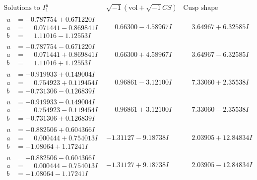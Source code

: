 \documentclass[1p]{elsarticle_modified}
\theoremstyle{definition}
\newcommand{\I}{\sqrt{-1}}
\begin{document}
$$\begin{array}{c|c|c}  
\text{Solutions to }I^u_{1}& \I (\text{vol} + \sqrt{-1}CS) & \text{Cusp shape}\\
 \hline 
\begin{aligned}
u &= -0.787754 + 0.671220 I \\
a &= \phantom{-}0.071441 - 0.869841 I \\
b &= \phantom{-}1.11016 - 1.12553 I\end{aligned}
 & \phantom{-}0.66300 - 4.58967 I & \phantom{-}3.64967 + 6.32585 I \\ \hline\begin{aligned}
u &= -0.787754 - 0.671220 I \\
a &= \phantom{-}0.071441 + 0.869841 I \\
b &= \phantom{-}1.11016 + 1.12553 I\end{aligned}
 & \phantom{-}0.66300 + 4.58967 I & \phantom{-}3.64967 - 6.32585 I \\ \hline\begin{aligned}
u &= -0.919933 + 0.149004 I \\
a &= \phantom{-}0.754923 + 0.119454 I \\
b &= -0.731306 - 0.126839 I\end{aligned}
 & \phantom{-}0.96861 - 3.12100 I & \phantom{-}7.33060 + 2.35538 I \\ \hline\begin{aligned}
u &= -0.919933 - 0.149004 I \\
a &= \phantom{-}0.754923 - 0.119454 I \\
b &= -0.731306 + 0.126839 I\end{aligned}
 & \phantom{-}0.96861 + 3.12100 I & \phantom{-}7.33060 - 2.35538 I \\ \hline\begin{aligned}
u &= -0.882506 + 0.604366 I \\
a &= \phantom{-}0.000444 + 0.754013 I \\
b &= -1.08064 + 1.17241 I\end{aligned}
 & -1.31127 - 9.18738 I & \phantom{-}2.03905 + 12.84834 I \\ \hline\begin{aligned}
u &= -0.882506 - 0.604366 I \\
a &= \phantom{-}0.000444 - 0.754013 I \\
b &= -1.08064 - 1.17241 I\end{aligned}
 & -1.31127 + 9.18738 I & \phantom{-}2.03905 - 12.84834 I \\ \hline\begin{aligned}

\end{aligned}
\end{array}$$
\end{document}
